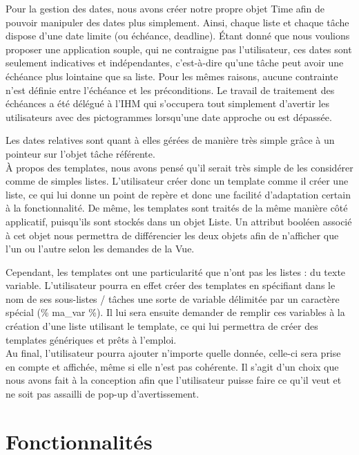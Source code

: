 		Pour la gestion des dates, nous avons créer notre propre objet Time afin de pouvoir manipuler des dates plus simplement. Ainsi, chaque liste et chaque tâche dispose d'une date limite (ou échéance, deadline). Étant donné que nous voulions proposer une application souple, qui ne contraigne pas l'utilisateur, ces dates sont seulement indicatives et indépendantes, c'est-à-dire qu'une tâche peut avoir une échéance plus lointaine que sa liste. Pour les mêmes raisons, aucune contrainte n'est définie entre l'échéance et les préconditions. Le travail de traitement des échéances a été délégué à l'IHM qui s'occupera tout simplement d'avertir les utilisateurs avec des pictogrammes lorsqu'une date approche ou est dépassée.
		
		Les dates relatives sont quant à elles gérées de manière très simple grâce à un pointeur sur l'objet tâche référente.\\
		
		À propos des templates, nous avons pensé qu'il serait très simple de les considérer comme de simples listes. L'utilisateur créer donc un template comme il créer une liste, ce qui lui donne un point de repère et donc une facilité d'adaptation certain à la fonctionnalité. De même, les templates sont traités de la même manière côté applicatif, puisqu'ils sont stockés dans un objet Liste. Un attribut booléen associé à cet objet nous permettra de différencier les deux objets afin de n'afficher que l'un ou l'autre selon les demandes de la Vue.
		
		Cependant, les templates ont une particularité que n'ont pas les listes : du texte variable. L'utilisateur pourra en effet créer des templates en spécifiant dans le nom de ses sous-listes / tâches une sorte de variable délimitée par un caractère spécial (\% ma\_var \%). Il lui sera ensuite demander de remplir ces variables à la création d'une liste utilisant le template, ce qui lui permettra de créer des templates génériques et prêts à l'emploi.\\
		
		Au final, l'utilisateur pourra ajouter n'importe quelle donnée, celle-ci sera prise en compte et affichée, même si elle n'est pas cohérente. Il s'agit d'un choix que nous avons fait à la conception afin que l'utilisateur puisse faire ce qu'il veut et ne soit pas assailli de pop-up d'avertissement.
		
		
	\section{Fonctionnalités}
	
